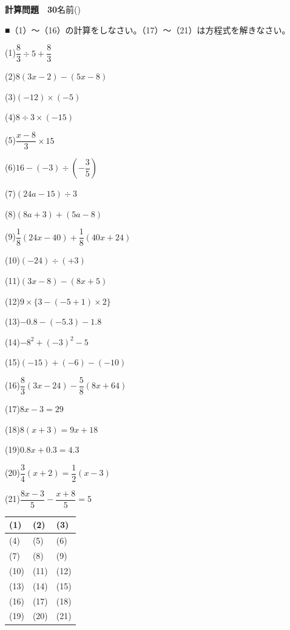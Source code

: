\documentclass[a4paper,11pt]{ltjsarticle}
\newlength{\qcol}\setlength{\qcol}{0.47\textwidth}
\newlength{\qgap}
\newlength{\anscolw}\setlength{\anscolw}{0.30\textwidth}
\newlength{\ansh}
\newcommand{\Q}[2]{\parbox[t]{\qcol}{\raggedright (#1)\hspace{0.6em}$\displaystyle #2$}}
\newcommand{\QR}[4]{\Q{#1}{#2}\hfill\Q{#3}{#4}\par\vspace{\qgap}}
\newcommand{\anscell}[1]{\rule[-\ansdrop]{0pt}{\ansh}(#1)}
\newlength{\ansdrop}
\begin{document}
{\large\bfseries 計算問題　30}\hfill 名前(\underline{\hspace{32mm}})\par\vspace{3mm}
■（1）〜（16）の計算をしなさい。（17）〜（21）は方程式を解きなさい。\par\vspace{3mm}
\setlength{\qgap}{5.4mm}
\QR{1}{\dfrac{8}{3}\div5+\dfrac{8}{3}}{2}{8(3x-2)-(5x-8)}
\QR{3}{(-12)\times(-5)}{4}{8\div3\times(-15)}
\QR{5}{\dfrac{x-8}{3}\times15}{6}{16-(-3)\div\left(-\dfrac{3}{5}\right)}
\QR{7}{(24a-15)\div3}{8}{(8a+3)+(5a-8)}
\QR{9}{\dfrac{1}{8}(24x-40)+\dfrac{1}{8}(40x+24)}{10}{(-24)\div(+3)}
\QR{11}{(3x-8)-(8x+5)}{12}{9\times\{3-(-5+1)\times2\}}
\QR{13}{-0.8-(-5.3)-1.8}{14}{-8^2+(-3)^2-5}
\QR{15}{(-15)+(-6)-(-10)}{16}{\dfrac{8}{3}(3x-24)-\dfrac{5}{8}(8x+64)}
\QR{17}{8x-3=29}{18}{8(x+3)=9x+18}
\QR{19}{0.8x+0.3=4.3}{20}{\dfrac{3}{4}(x+2)=\dfrac{1}{2}(x-3)}
\vspace{1mm}
\Q{21}{\dfrac{8x-3}{5}-\dfrac{x+8}{5}=5}\par\vspace{3mm}
\setlength{\ansh}{9.5mm}\setlength{\ansdrop}{6mm}%
\begin{center}\begin{tabular}{|p{\anscolw}|p{\anscolw}|p{\anscolw}|}\hline
\anscell{1} & \anscell{2} & \anscell{3} \\\hline
\anscell{4} & \anscell{5} & \anscell{6} \\\hline
\anscell{7} & \anscell{8} & \anscell{9} \\\hline
\anscell{10} & \anscell{11} & \anscell{12} \\\hline
\anscell{13} & \anscell{14} & \anscell{15} \\\hline
\anscell{16} & \anscell{17} & \anscell{18} \\\hline
\anscell{19} & \anscell{20} & \anscell{21} \\\hline
\end{tabular}\end{center}
\end{document}
